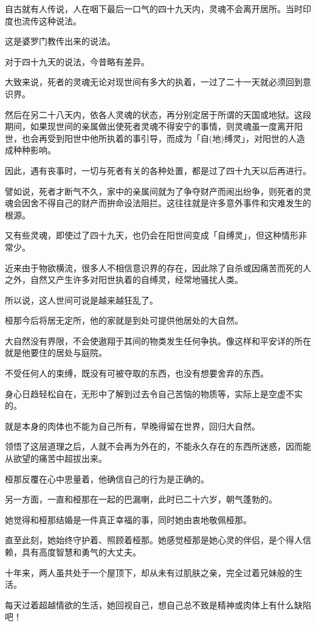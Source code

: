 \documentclass[twoside,openany]{book}
\begin{document}
自古就有人传说，人在咽下最后一口气的四十九天内，灵魂不会离开居所。当时印度也流传这种说法。

这是婆罗门教传出来的说法。

对于四十九天的说法，今昔略有差异。

大致来说，死者的灵魂无论对现世间有多大的执着，一过了二十一天就必须回到意识界。

然后在另二十八天内，依各人灵魂的状态，再分别定居于所谓的天国或地狱。这段期间，如果现世间的亲属做出使死者灵魂不得安宁的事情，则灵魂虽一度离开阳世，也会再受到阳世中他所执着的事引导，而成为「自(地)缚灵」，对阳世的人造成种种影响。

因此，遇有丧事时，一切与死者有关的各种处置，都是过了四十九天以后再进行。

譬如说，死者才断气不久，家中的亲属间就为了争夺财产而闹出纷争，则死者的灵魂会因舍不得自己的财产而拚命设法阻拦。这往往就是许多意外事件和灾难发生的根源。

又有些灵魂，即使过了四十九天，也仍会在阳世间变成「自缚灵」，但这种情形非常少。

近来由于物欲横流，很多人不相信意识界的存在，因此除了自杀或因痛苦而死的人之外，自然又产生许多对阳世执着的自缚灵，经常地骚扰人类。

所以说，这人世间可说是越来越狂乱了。

桠那今后将居无定所，他的家就是到处可提供他居处的大自然。

大自然没有界限，不会使遨翔于其间的物类发生任何争执。像这样和平安详的所在就是他要住的居处与庭院。

不受任何人的束缚，既没有可被夺取的东西，也没有想要舍弃的东西。

身心日趋轻松自在，无形中了解到过去令自己苦恼的物质等，实际上是空虚不实的。

就是本身的肉体也不能为自己所有，早晚得留在世界，回归大自然。

领悟了这层道理之后，人就不会再为外在的，不能永久存在的东西所迷惑，因而能从欲望的痛苦中超拔出来。

桠那反覆在心中思量着，他确信自己的行为是正确的。

另一方面，一直和桠那在一起的巴漏喇，此时已二十六岁，朝气蓬勃的。

她觉得和桠那结婚是一件真正幸福的事，同时她由衷地敬佩桠那。

直至此刻，她始终守护着、照顾着桠那。她感觉桠那是她心灵的伴侣，是个得人信赖，具有高度智慧和勇气的大丈夫。

十年来，两人虽共处于一个屋顶下，却从未有过肌肤之亲，完全过着兄妹般的生活。

每天过着超越情欲的生活，她回视自己，想自己总不致是精神或肉体上有什么缺陷吧！
\end{document}
